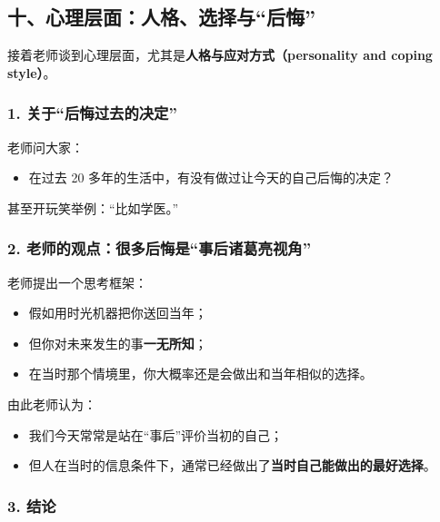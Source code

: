 \documentclass[
  chinese,
  9pt,
  a4paper,
]{ctexart}
\providecommand{\tightlist}{%
  \setlength{\itemsep}{0pt}\setlength{\parskip}{0pt}}
\begin{document}
\subsection{十、心理层面：人格、选择与``后悔''}\label{ux5341ux5fc3ux7406ux5c42ux9762ux4ebaux683cux9009ux62e9ux4e0eux540eux6094}

接着老师谈到心理层面，尤其是\textbf{人格与应对方式（personality and
coping style）}。

\subsubsection{1.
关于``后悔过去的决定''}\label{ux5173ux4e8eux540eux6094ux8fc7ux53bbux7684ux51b3ux5b9a}

老师问大家：

\begin{itemize}
\tightlist
\item
  在过去 20 多年的生活中，有没有做过让今天的自己后悔的决定？
\end{itemize}

甚至开玩笑举例：``比如学医。''

\subsubsection{2.
老师的观点：很多后悔是``事后诸葛亮视角''}\label{ux8001ux5e08ux7684ux89c2ux70b9ux5f88ux591aux540eux6094ux662fux4e8bux540eux8bf8ux845bux4eaeux89c6ux89d2}

老师提出一个思考框架：

\begin{itemize}
\tightlist
\item
  假如用时光机器把你送回当年；
\item
  但你对未来发生的事\textbf{一无所知}；
\item
  在当时那个情境里，你大概率还是会做出和当年相似的选择。
\end{itemize}

由此老师认为：

\begin{itemize}
\tightlist
\item
  我们今天常常是站在``事后''评价当初的自己；
\item
  但人在当时的信息条件下，通常已经做出了\textbf{当时自己能做出的最好选择}。
\end{itemize}

\subsubsection{3. 结论}\label{ux7ed3ux8bba-1}
\end{document}
